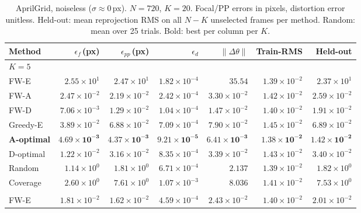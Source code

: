 \documentclass[letterpaper, 9
 pt, conference]{ieeeconf}
\begin{document}
\begin{table}[ht]
\centering
\setlength{\tabcolsep}{4pt}
\caption{AprilGrid, noiseless ($\sigma{\approx}0$\,px). $N{=}720$, $K{=}20$. Focal/PP errors in pixels, distortion error unitless. Held-out: mean reprojection RMS on all $N{-}K$ unselected frames per method. Random: mean over 25 trials. Bold: best per column per $K$.}
\label{tab:ksweep_aprilgrid_noiseless}
\scriptsize
\renewcommand{\arraystretch}{0.80}
\begin{tabular}{lrrrrrr}
\toprule
Method & $\epsilon_f$\,(px) & $\epsilon_{pp}$\,(px) & $\epsilon_d$ & $\|\Delta\theta\|$ & Train-RMS & Held-out \\
\midrule
\multicolumn{7}{l}{\textit{$K{=}5$}} \\[1pt]
FW-E & $2.55\!\times\!10^{1}$ & $2.47\!\times\!10^{1}$ & $1.82\!\times\!10^{-4}$ & $35.54$ & $1.39\!\times\!10^{-2}$ & $2.37\!\times\!10^{1}$ \\
FW-A & $2.47\!\times\!10^{-2}$ & $2.19\!\times\!10^{-2}$ & $2.42\!\times\!10^{-4}$ & $3.30\!\times\!10^{-2}$ & $1.42\!\times\!10^{-2}$ & $2.59\!\times\!10^{-2}$ \\
FW-D & $7.06\!\times\!10^{-3}$ & $1.29\!\times\!10^{-2}$ & $1.04\!\times\!10^{-4}$ & $1.47\!\times\!10^{-2}$ & $1.40\!\times\!10^{-2}$ & $1.91\!\times\!10^{-2}$ \\
Greedy-E & $3.89\!\times\!10^{-2}$ & $6.88\!\times\!10^{-2}$ & $7.09\!\times\!10^{-4}$ & $7.90\!\times\!10^{-2}$ & $1.45\!\times\!10^{-2}$ & $6.89\!\times\!10^{-2}$ \\
\textbf{A-optimal} & $\mathbf{4.69\!\times\!10^{-3}}$ & $\mathbf{4.37\!\times\!10^{-3}}$ & $\mathbf{9.21\!\times\!10^{-5}}$ & $\mathbf{6.41\!\times\!10^{-3}}$ & $\mathbf{1.38\!\times\!10^{-2}}$ & $\mathbf{1.42\!\times\!10^{-2}}$ \\
D-optimal & $1.22\!\times\!10^{-2}$ & $3.16\!\times\!10^{-2}$ & $8.35\!\times\!10^{-4}$ & $3.39\!\times\!10^{-2}$ & $1.43\!\times\!10^{-2}$ & $3.40\!\times\!10^{-2}$ \\
Random & $1.14\!\times\!10^{0}$ & $1.81\!\times\!10^{0}$ & $6.71\!\times\!10^{-4}$ & $2.137$ & $1.39\!\times\!10^{-2}$ & $1.82\!\times\!10^{0}$ \\
Coverage & $2.60\!\times\!10^{0}$ & $7.61\!\times\!10^{0}$ & $1.07\!\times\!10^{-3}$ & $8.036$ & $1.41\!\times\!10^{-2}$ & $7.53\!\times\!10^{0}$ \\
\addlinespace[1pt]
\multicolumn{7}{l}{\textit{$K{=}10$}} \\[1pt]
FW-E & $1.81\!\times\!10^{-2}$ & $1.62\!\times\!10^{-2}$ & $4.59\!\times\!10^{-4}$ & $2.43\!\times\!10^{-2}$ & $1.40\!\times\!10^{-2}$ & $2.01\!\times\!10^{-2}$ \\

\end{tabular}
\end{table}
\end{document}
